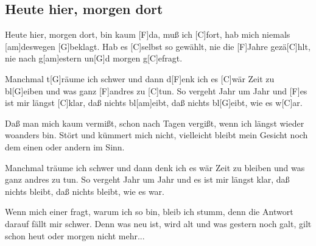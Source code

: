 \subsection*{Heute hier, morgen dort   }
\begin{guitar}
[C]Heute hier, morgen dort, bin kaum [F]da, muß ich [C]fort,
hab mich niemals [am]deswegen [G]beklagt.
Hab es [C]selbst so gewählt, nie die [F]Jahre gezä[C]hlt,
nie nach g[am]estern un[G]d morgen g[C]efragt.

Manchmal t[G]räume ich schwer und dann d[F]enk ich es [C]wär
Zeit zu bl[G]eiben und was ganz [F]andres zu [C]tun.
So vergeht Jahr um Jahr und [F]es ist mir längst [C]klar,
daß nichts bl[am]eibt, daß nichts bl[G]eibt, wie es w[C]ar.

Daß man mich kaum vermißt, schon nach Tagen vergißt,
wenn ich längst wieder woanders bin.
Stört und kümmert mich nicht, vielleicht bleibt mein Gesicht
noch dem einen oder andern im Sinn.

Manchmal träume ich schwer und dann denk ich es wär
Zeit zu bleiben und was ganz andres zu tun.
So vergeht Jahr um Jahr und es ist mir längst klar,
daß nichts bleibt, daß nichts bleibt, wie es war.

Wenn mich einer fragt, warum ich so bin, bleib ich stumm,
denn die Antwort darauf fällt mir schwer.
Denn was neu ist, wird alt und was gestern noch galt,
gilt schon heut oder morgen nicht mehr... 
\end{guitar}
